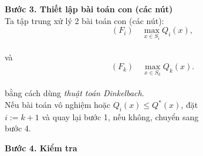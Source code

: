 \documentclass{beamer}
\begin{document}
\begin{frame}
\setlength{\parindent}{4em}
\noindent \textbf{Bước 3. Thiết lập bài toán con (các nút)} \\
Ta tập trung xử lý 2 bài toán con (các nút):
\begin{equation*}
(F_i) \quad \underset{x \in S_i}{\max}Q_i(x),
\end{equation*} \\
và
\begin{equation*}
(F_{k}) \quad \underset{x \in S_k}{\max}Q_k(x).
\end{equation*} \\
bằng cách dùng \textsl{thuật toán Dinkelbach}. \\
Nếu bài toán vô nghiệm hoặc $Q_i(x)\leq Q^*(x)$, đặt \\ $i:=k+1$ và quay lại bước 1, nếu không, chuyển sang \\ bước 4. \\
\end{frame}

\begin{frame}
\setlength{\parindent}{4em}
\noindent \textbf{Bước 4. Kiểm tra} \\
\end{frame}

\begin{frame}
\end{frame}
\end{document}
